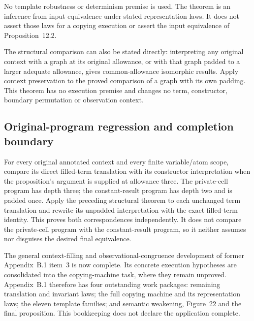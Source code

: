 No template robustness or determinism premise is used. The theorem is an
inference from input equivalence under stated representation laws. It does
not assert those laws for a copying execution or assert the input equivalence
of Proposition~12.2.



The structural comparison can also be stated directly: interpreting any
original context with a graph at its original allowance, or with that graph
padded to a larger adequate allowance, gives common-allowance isomorphic
results. Apply context preservation to the proved comparison of a graph with
its own padding. This theorem has no execution premise and changes no term,
constructor, boundary permutation or observation context.



\subsection{Original-program regression and completion boundary}

For every original annotated context and every finite variable/atom scope,
compare its direct filled-term translation with its constructor interpretation
when the proposition's argument is supplied at allowance three. The private-cell
program has depth three; the constant-result program has depth two and is
padded once. Apply the preceding structural theorem to each unchanged term
translation and rewrite its unpadded interpretation with the exact filled-term
identity. This proves both correspondences independently. It does not compare
the private-cell program with the constant-result program, so it neither
assumes nor disguises the desired final equivalence.

The general context-filling and observational-congruence development of former
Appendix~B.1 item~3 is now complete. Its concrete execution hypotheses are
consolidated into the copying-machine task, where they remain unproved.
Appendix~B.1 therefore has four outstanding work packages: remaining translation
and invariant laws; the full copying machine and its representation laws;
the eleven template families; and semantic weakening, Figure~22 and the final
proposition. This bookkeeping does not declare the application complete.


